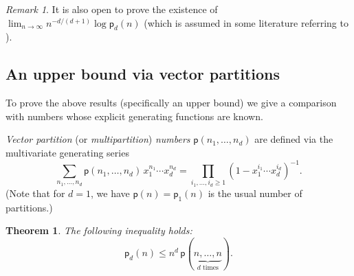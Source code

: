\documentclass[12pt]{amsart}
\newtheorem{theorem}{Theorem}[section]
\theoremstyle{definition}
\theoremstyle{remark}
\newtheorem{remark}{Remark}
\begin{document}

\begin{remark}
It is also open to prove the existence of 
$\lim_{n \to \infty } {n^{-d/(d+1)}} {\log \mathsf{p}_d(n)}$
(which is assumed in some literature referring to \cite{bhatia}). 
\end{remark}

\subsection{An upper bound via vector partitions} 
 
To prove the above results (specifically an upper bound) we give a comparison with numbers whose explicit generating functions are known. %


{\it Vector partition} (or {\it multipartition}) {\it numbers} $\mathsf{p}(n_1,\ldots, n_d)$ are defined via the multivariate generating series 
$$
\sum_{n_1,\ldots, n_d } \mathsf{p}(n_1,\ldots, n_d)\, x_1^{n_1} \cdots x_d^{n_d}  = \prod_{i_1,\ldots, i_d \ge 1} \left(1 - x_1^{i_1} \cdots x_d^{i_d} \right)^{-1}.
$$
(Note that for $d = 1$, we have $\mathsf{p}(n) = \mathsf{p}_1(n)$ is the usual number of partitions.) 


\begin{theorem}\label{thmc}
The following inequality holds:
$$
\mathsf{p}_d(n) \le n^{d}\, {\mathsf{p}}(\underbrace{n, \ldots, n}_{d \text{ times}}). %
$$
\end{theorem}
\end{document}
